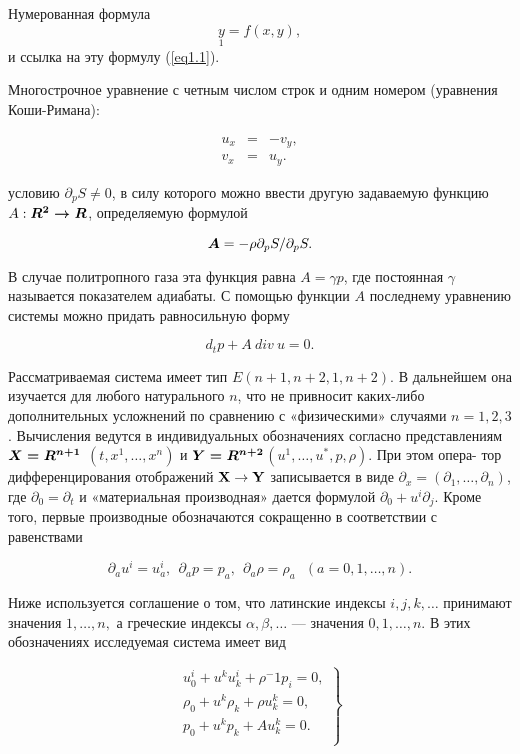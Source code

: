 \documentclass{report}
\newcommand{\bm}[1]{\mbox{\boldmath{\(#1\)}}}
\begin{document}
Нумерованная формула
$$%
\underset{1}{y}=f(x,y),
$$%
и ссылка на эту формулу (\ref{eq1.1}).

Многострочное уравнение с четным числом строк и одним номером
(уравнения Коши-Римана):

$$\begin{array}{rcl}
u_x &=& -v_y,\\[3pt]
v_x &=& u_y.
\end{array}
$$%


\newpage
\noindent условию $\partial_p S \neq 0$, в силу которого можно ввести другую задаваемую функцию $ A: \bm{R^2 \rightarrow R}$, определяемую формулой

$$ \bm{A} = -\rho\partial_p S / \partial_p S.$$

В случае политропного газа эта функция равна $A = \gamma$$p$, где постоянная $\gamma$ называется показателем адиабаты. С помощью функции $A$
последнему уравнению системы можно придать равносильную
форму

$$ d_t p + A \ div \ u = 0. $$

Рассматриваемая система имеет тип $E(n+1, n+2, 1, n+2)$.
В дальнейшем она изучается для любого натурального $n$, что
не привносит каких-либо дополнительных усложнений по сравнению с «физическими» случаями $n = 1, 2, 3$. Вычисления ведутся
в индивидуальных обозначениях согласно представлениям $\bm{X = R^{n+1}}$ $(t, x^1, \ldots, x^n)$ и $\bm{Y = R^{n+2}}$$ (u^1,\ldots,u^*,p,\rho)$. При этом опера-
тор дифференцирования отображений $\bf{X \rightarrow Y}$ записывается в виде
$\partial_x = (\partial_1, \ldots, \partial_n)$, где $\partial_0 = \partial_t$ и «материальная производная»
дается формулой $\partial_0+u^i \partial_j$. Кроме того, первые производные обозначаются сокращенно в соответствии с равенствами

$$\partial_a u^i = u^i_a, \ \ \partial_a p=p_a, \ \ \partial_a \rho=\rho_a   \ \ \ (a=0,1,\ldots,n). $$

Ниже используется соглашение о том, что латинские индексы
$i,j,k, \ldots$ принимают значения $1, \ldots, n,$ а греческие индексы
$\alpha,\beta,\ldots$ — значения $0, 1, \ldots, n$. В этих обозначениях исследуемая система имеет вид

\begin{equation} \label{eq1.1} \left.
  \begin{array}{r}
    u^i_0 +u^ku^i_k+\rho^-1 p_i = 0, \\
    \rho_0 + u^k \rho_k + \rho u^k_k = 0, \\
                p_0 + u^k p_k + Au^k_k = 0. \\
  \end{array}
\right\} \end{equation}
\end{document}
